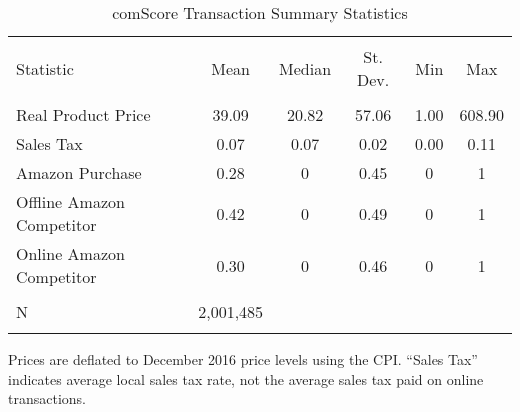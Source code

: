 
\begin{table}[!htbp] \centering
  \caption{comScore Transaction Summary Statistics}
  \label{tab:comScoreSummary}
\begin{tabular}{@{\extracolsep{5pt}}lccccc}
\\[-1.8ex]\hline
\hline \\[-1.8ex]
Statistic & \multicolumn{1}{c}{Mean} & \multicolumn{1}{c}{Median} & \multicolumn{1}{c}{St. Dev.} & \multicolumn{1}{c}{Min} & \multicolumn{1}{c}{Max} \\
\hline \\[-1.8ex]
Real Product Price & 39.09 & 20.82 & 57.06 & 1.00 & 608.90 \\
Sales Tax & 0.07 & 0.07 & 0.02 & 0.00 & 0.11 \\
Amazon Purchase & 0.28 & 0 & 0.45 & 0 & 1 \\
Offline Amazon Competitor & 0.42 & 0 & 0.49 & 0 & 1 \\
Online Amazon Competitor & 0.30 & 0 & 0.46 & 0 & 1 \\
\hline \\[-1.8ex]
N & \multicolumn{1}{c}{2,001,485} \\
\hline \\[-1.8ex]
\end{tabular}
\begin{tablenotes}
Prices are deflated to December 2016 price levels using the CPI. ``Sales Tax'' indicates average local sales tax rate, not the average sales tax paid on online transactions.
\end{tablenotes}
\end{table}
